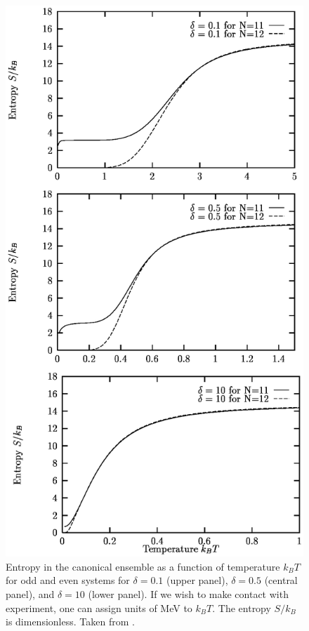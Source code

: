 \documentclass[rmp,aps,floatfix]{revtex4}
\begin{document}
\begin{figure}
\includegraphics[scale=0.5,angle=0]{dean_hjorthjensen_fig30.ps}
\caption{Entropy in the canonical ensemble as a function 
of temperature $k_BT$ for odd and even systems for $\delta=0.1$ 
(upper panel), $\delta=0.5$ (central panel),
and $\delta=10$ (lower panel).
If we wish to make contact with experiment, one can assign units 
of MeV to $k_BT$.  The entropy $S/k_B$ is dimensionless. Taken from \cite{entropy2000}.
} 
\label{fig:fig5_sec3}
\end{figure}
\end{document}
